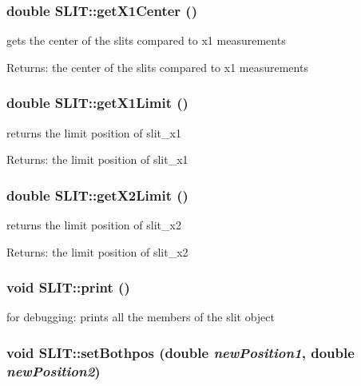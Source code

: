 \subsubsection{\setlength{\rightskip}{0pt plus 5cm}double SLIT::get\-X1Center ()}\label{classSLIT_535c0fe821232b915d82c19e387bfaf1}


gets the center of the slits compared to x1 measurements \begin{Desc}
\item[Returns:]the center of the slits compared to x1 measurements \end{Desc}
\subsubsection{\setlength{\rightskip}{0pt plus 5cm}double SLIT::get\-X1Limit ()}\label{classSLIT_e5831b97d54a6ea447a92aeb4899a451}


returns the limit position of slit\_\-x1 \begin{Desc}
\item[Returns:]the limit position of slit\_\-x1 \end{Desc}
\subsubsection{\setlength{\rightskip}{0pt plus 5cm}double SLIT::get\-X2Limit ()}\label{classSLIT_5a161e955e7c0b2f63b5f053ac00dd76}


returns the limit position of slit\_\-x2 \begin{Desc}
\item[Returns:]the limit position of slit\_\-x2 \end{Desc}
\subsubsection{\setlength{\rightskip}{0pt plus 5cm}void SLIT::print ()}\label{classSLIT_89fed1e0eb4f61270d4c86643f296958}


for debugging: prints all the members of the slit object 
\subsubsection{\setlength{\rightskip}{0pt plus 5cm}void SLIT::set\-Bothpos (double {\em new\-Position1}, double {\em new\-Position2})}\label{classSLIT_ca8deba292e1823cfee90f5c1be493a0}


